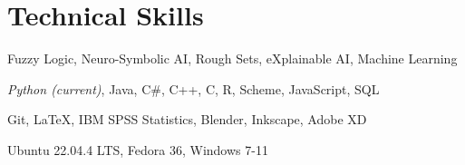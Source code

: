 \documentclass[11pt]{article} %
\begin{document}
\vspace{-12pt}

\section{Technical Skills}
\vspace{-8pt}
\begin{description}[itemsep=0pt]
\setlength\itemsep{-0.5em}
    \item[Interests:] Fuzzy Logic, Neuro-Symbolic AI, Rough Sets, eXplainable AI, Machine Learning
    \item[Languages:] \textit{Python (current)}, Java, C\#, C++, C, R, Scheme, JavaScript, SQL
	\item[Software:] Git, \LaTeX, IBM SPSS Statistics, Blender, Inkscape, Adobe XD
    \item[Operating Systems:] Ubuntu 22.04.4 LTS, Fedora 36, Windows 7-11
\end{description}
\end{document}
